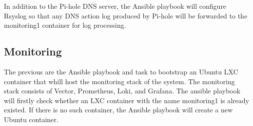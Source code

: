\documentclass[../index.tex]{subfiles}
\begin{document}
In addition to the Pi-hole DNS server, the Ansible playbook will configure Rsyslog so that any DNS
action log produced by Pi-hole will be forwarded to the monitoring1 container for log processing.

\subsection{Monitoring}

The previous are the Ansible playbook and task to bootstrap an Ubuntu LXC container that whill host
the monitoring stack of the system. The monitoring stack consists of Vector, Prometheus, Loki, and
Grafana. The ansible playbook will firstly check whether an LXC container with the name monitoring1
is already existed. If there is no such container, the Ansible playbook will create a new Ubuntu
container.

\end{document}
